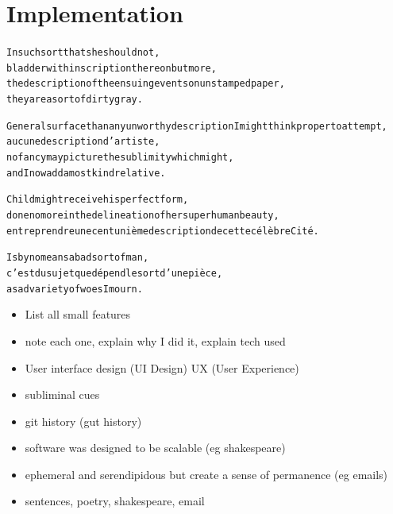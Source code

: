 
\chapter{Implementation}
\label{ch:implementation}

\startcontents[chapters]

\vfill

\begin{alltt}\sffamily
In such sort that she should not,
bladder with inscription thereon but more,
the description of the ensuing events on unstamped paper,
they are a sort of dirty gray.

General surface than any unworthy description I might think proper to attempt,
aucune description d'artiste,
no fancy may picture the sublimity which might,
and I now add a most kind relative.

Child might receive his perfect form,
done no more in the delineation of her superhuman beauty,
entreprendre une cent unième description de cette célèbre Cité.

Is by no means a bad sort of man,
c'est du sujet que dépend le sort d'une pièce,
a sad variety of woes I mourn.
\end{alltt}

\newpage
\minicontents
\spirals


\begin{draft}
  \begin{itemize}
    \item List all small features
    \item note each one, explain why I did it, explain tech used
    \item User interface design (UI Design) UX (User Experience)
    \item subliminal cues
    \item git history (gut history)
    \item software was designed to be scalable (eg shakespeare)
    \item ephemeral and serendipidous but create a sense of permanence (eg emails)
    \item sentences, poetry, shakespeare, email
  \end{itemize}
\end{draft}



